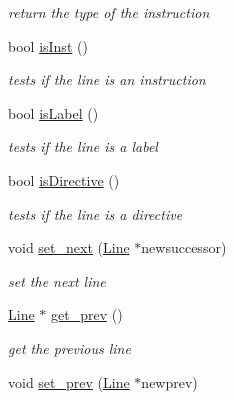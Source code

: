 \begin{DoxyCompactItemize}
\begin{DoxyCompactList}\small\item\em return the type of the instruction \end{DoxyCompactList}\item 
\hypertarget{class_line_a57e724949fa0828dfdd2a1bb0f7db8d0}{}bool \hyperlink{class_line_a57e724949fa0828dfdd2a1bb0f7db8d0}{is\+Inst} ()\label{class_line_a57e724949fa0828dfdd2a1bb0f7db8d0}

\begin{DoxyCompactList}\small\item\em tests if the line is an instruction \end{DoxyCompactList}\item 
\hypertarget{class_line_a8323f3df960924826199bd607198ac7f}{}bool \hyperlink{class_line_a8323f3df960924826199bd607198ac7f}{is\+Label} ()\label{class_line_a8323f3df960924826199bd607198ac7f}

\begin{DoxyCompactList}\small\item\em tests if the line is a label \end{DoxyCompactList}\item 
\hypertarget{class_line_ad014e40a75c8a04e6a091ae4110579bc}{}bool \hyperlink{class_line_ad014e40a75c8a04e6a091ae4110579bc}{is\+Directive} ()\label{class_line_ad014e40a75c8a04e6a091ae4110579bc}

\begin{DoxyCompactList}\small\item\em tests if the line is a directive \end{DoxyCompactList}\item 
\hypertarget{class_line_a66770cb09833f18ec4d5b494f5edae77}{}void \hyperlink{class_line_a66770cb09833f18ec4d5b494f5edae77}{set\+\_\+next} (\hyperlink{class_line}{Line} $\ast$newsuccessor)\label{class_line_a66770cb09833f18ec4d5b494f5edae77}

\begin{DoxyCompactList}\small\item\em set the next line \end{DoxyCompactList}\item 
\hypertarget{class_line_ae834b48e9f1c9450f93ec7bb6a43fb1a}{}\hyperlink{class_line}{Line} $\ast$ \hyperlink{class_line_ae834b48e9f1c9450f93ec7bb6a43fb1a}{get\+\_\+prev} ()\label{class_line_ae834b48e9f1c9450f93ec7bb6a43fb1a}

\begin{DoxyCompactList}\small\item\em get the previous line \end{DoxyCompactList}\item 
\hypertarget{class_line_abf7301d0514bf6dafdc9da9ad79a4341}{}void \hyperlink{class_line_abf7301d0514bf6dafdc9da9ad79a4341}{set\+\_\+prev} (\hyperlink{class_line}{Line} $\ast$newprev)\label{class_line_abf7301d0514bf6dafdc9da9ad79a4341}


\end{DoxyCompactItemize}
